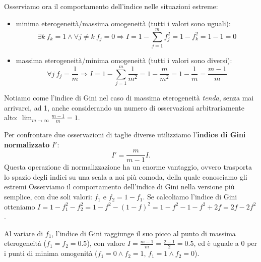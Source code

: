 \noindent Osserviamo ora il comportamento dell'indice nelle situazioni estreme: \begin{itemize}
    \item minima eterogeneità/massima omogeneità (tutti i valori sono uguali): \[
    \exists k \: f_k = 1 \land \forall j \neq k \: f_j = 0 \Rightarrow I = 1 - \sum_{j=1}^m f^2_j = 1 - f^2_k = 1 - 1 = 0
    \]
    \item massima eterogeneità/minima omogeneità (tutti i valori sono diversi): \[ 
    \forall j \: f_j = \frac{1}{m} \Rightarrow I = 1 - \sum_{j=1}^m \frac{1}{m^2} = 1 - \frac{m}{m^2} = 1 - \frac{1}{m} = \frac{m-1}{m}
    \]
\end{itemize}

\noindent Notiamo come l'indice di Gini nel caso di massima eterogeneità \textit{tenda}, senza mai arrivarci, ad 1, anche considerando un numero di osservazioni arbitrariamente alto: $\lim_{m \to \infty}\frac{m-1}{m} = 1$.

\noindent Per confrontare due osservazioni di taglie diverse utilizziamo l'\textbf{indice di Gini normalizzato} $I'$: \[
\boxed{
I' = \frac{m}{m-1} I
}.
\]
Questa operazione di normalizzazione ha un enorme vantaggio, ovvero trasporta lo spazio degli indici su una scala a noi più comoda, della quale conosciamo gli estremi
\newline \newline Osserviamo il comportamento dell'indice di Gini nella versione più semplice, con due soli valori: $f_1$ e $f_2 = 1 - f_1$.
\newline Se calcoliamo l'indice di Gini otteniamo $I = 1 - f_1^2 - f_2^2 = 1 - f^2 - (1-f)^2 =1 - f^2 - 1 - f^2 + 2f = 2f - 2f^2$.

\begin{center}
\end{center}

\noindent Al variare di $f_1$, l'indice di Gini raggiunge il suo picco al punto di massima eterogeneità ($f_1 = f_2 = 0.5$), con valore $I = \frac{m-1}m = \frac{2-1}{2} = 0.5$, ed è uguale a 0 per i punti di minima omogenità ($f_1 = 0 \land f_2 = 1$, $f_1 = 1 \land f_2 = 0$).

